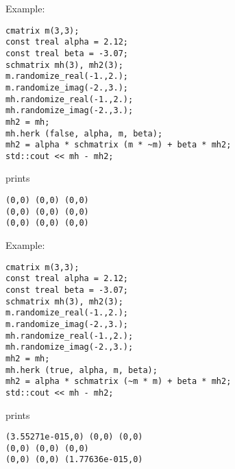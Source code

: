 Example:
\begin{Verbatim}
cmatrix m(3,3);
const treal alpha = 2.12;
const treal beta = -3.07;
schmatrix mh(3), mh2(3);
m.randomize_real(-1.,2.);
m.randomize_imag(-2.,3.);
mh.randomize_real(-1.,2.);
mh.randomize_imag(-2.,3.);
mh2 = mh;
mh.herk (false, alpha, m, beta);
mh2 = alpha * schmatrix (m * ~m) + beta * mh2;
std::cout << mh - mh2;
\end{Verbatim}
prints
\begin{Verbatim}
(0,0) (0,0) (0,0)
(0,0) (0,0) (0,0)
(0,0) (0,0) (0,0)
\end{Verbatim}
Example:
\begin{Verbatim}
cmatrix m(3,3);
const treal alpha = 2.12;
const treal beta = -3.07;
schmatrix mh(3), mh2(3);
m.randomize_real(-1.,2.);
m.randomize_imag(-2.,3.);
mh.randomize_real(-1.,2.);
mh.randomize_imag(-2.,3.);
mh2 = mh;
mh.herk (true, alpha, m, beta);
mh2 = alpha * schmatrix (~m * m) + beta * mh2;
std::cout << mh - mh2;
\end{Verbatim}
prints
\begin{Verbatim}
(3.55271e-015,0) (0,0) (0,0)
(0,0) (0,0) (0,0)
(0,0) (0,0) (1.77636e-015,0)
\end{Verbatim}
\newpage




